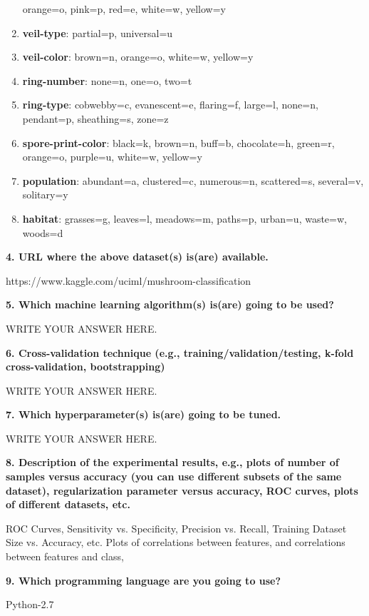 \documentclass[10pt,letterpaper]{article}
\newcommand{\somespace}{\vspace{0.075in}}
\begin{document}
\begin{enumerate}
        orange=o,
        pink=p,
        red=e,
        white=w,
        yellow=y
    \item \textbf{veil-type}:
        partial=p,
        universal=u
    \item \textbf{veil-color}:
        brown=n,
        orange=o,
        white=w,
        yellow=y
    \item \textbf{ring-number}:
        none=n,
        one=o,
        two=t
    \item \textbf{ring-type}:
        cobwebby=c,
        evanescent=e,
        flaring=f,
        large=l,
        none=n,
        pendant=p,
        sheathing=s,
        zone=z
    \item \textbf{spore-print-color}:
        black=k,
        brown=n,
        buff=b,
        chocolate=h,
        green=r,
        orange=o,
        purple=u,
        white=w,
        yellow=y
    \item \textbf{population}:
        abundant=a,
        clustered=c,
        numerous=n,
        scattered=s,
        several=v,
        solitary=y
    \item \textbf{habitat}:
        grasses=g,
        leaves=l,
        meadows=m,
        paths=p,
        urban=u,
        waste=w,
        woods=d
\end{enumerate}

\somespace
\noindent \textbf{4. URL where the above dataset(s) is(are) available.}
\somespace

https://www.kaggle.com/uciml/mushroom-classification

\somespace
\noindent \textbf{5. Which machine learning algorithm(s) is(are) going to be used?}
\somespace

WRITE YOUR ANSWER HERE.

\somespace
\noindent \textbf{6. Cross-validation technique (e.g., training/validation/testing, k-fold cross-validation, bootstrapping)}
\somespace

WRITE YOUR ANSWER HERE.

\somespace
\noindent \textbf{7. Which hyperparameter(s) is(are) going to be tuned.}
\somespace

WRITE YOUR ANSWER HERE.

\somespace
\noindent \textbf{8. Description of the experimental results, e.g., plots of number of samples versus accuracy (you can use different subsets of the same dataset), regularization parameter versus accuracy, ROC curves, plots of different datasets, etc.}
\somespace

ROC Curves, Sensitivity vs. Specificity, Precision vs. Recall, Training Dataset Size vs. Accuracy, etc.
Plots of correlations between features, and correlations between features and class, 

\somespace
\noindent \textbf{9. Which programming language are you going to use?}
\somespace

Python-2.7

\somespace
\end{document}
